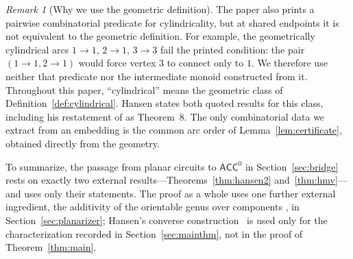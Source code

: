 \documentclass[11pt]{article}
\theoremstyle{definition}
\theoremstyle{remark}
\newtheorem{remark}[theorem]{Remark}
\newcommand{\ACC}{\mathsf{ACC}^0}
\begin{document}
\begin{remark}[Why we use the geometric definition]\label{rem:hmv-predicate}
The paper \cite{HMV02} also prints a pairwise combinatorial predicate for
cylindricality, but at shared endpoints it is not equivalent to the geometric
definition.  For example, the geometrically cylindrical arcs
$1\to1$, $2\to1$, $3\to3$ fail the printed condition: the pair
$(1{\to}1,2{\to}1)$ would force vertex $3$ to connect only to $1$.
We therefore use neither that predicate nor the intermediate monoid constructed
from it.  Throughout this paper, ``cylindrical'' means the geometric class of
Definition~\ref{def:cylindrical}.  Hansen \cite{Hansen03} states both quoted
results for this class, including his restatement of \cite[Theorem~2]{HMV02} as
Theorem~8.  The only combinatorial data we extract from an embedding is the common
arc order of Lemma~\ref{lem:certificate}, obtained directly from the geometry.
\end{remark}

To summarize, the passage from planar circuits to $\ACC$ in Section~\ref{sec:bridge}
rests on exactly two external results---Theorems~\ref{thm:hansen2}
and~\ref{thm:hmv}---and uses only their statements.  The proof as a whole uses one
further external ingredient, the additivity of the orientable genus over components
\cite{BHKY62}, in Section~\ref{sec:planarizer}; Hansen's converse
construction~\cite[Theorem~1]{Hansen03} is used only for the characterization recorded in
Section~\ref{sec:mainthm}, not in the proof of Theorem~\ref{thm:main}.
\end{document}
